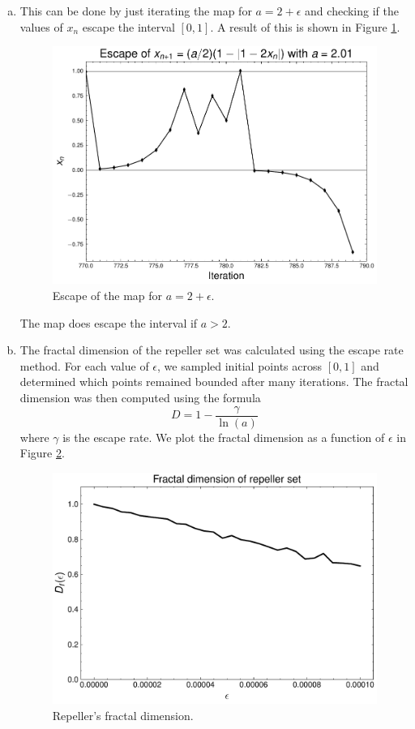\begin{enumerate}[(a)]
    \item This can be done by just iterating the map for $a=2+\epsilon$ and checking if the values of $x_n$
    escape the interval $[0,1]$. A result of this is shown in Figure \ref{fig:4a}.

    \begin{figure}[!ht]
        \centering
        \includegraphics[scale=0.70]{images/escape_map.pdf}
        \caption{Escape of the map for $a=2+\epsilon$.}
        \label{fig:4a}
    \end{figure}

    The map does escape the interval if $a > 2$.
    \item The fractal dimension of the repeller set was calculated using the escape rate method. 
    For each value of $\epsilon$, we sampled initial points across $[0,1]$ and determined which points
    remained bounded after many iterations. The fractal dimension was then computed using the formula 
    \[
    D = 1 - \frac{\gamma}{\ln(a)}
    \]
    where $\gamma$ is the escape rate. We plot the fractal dimension as a function of $\epsilon$ in Figure \ref{fig:4b}.
    \begin{figure}[!ht]
        \centering
        \includegraphics[scale=0.70]{images/fractal_dimension_repeller.pdf}
        \caption{Repeller's fractal dimension.}
        \label{fig:4b}
    \end{figure}


\end{enumerate}
